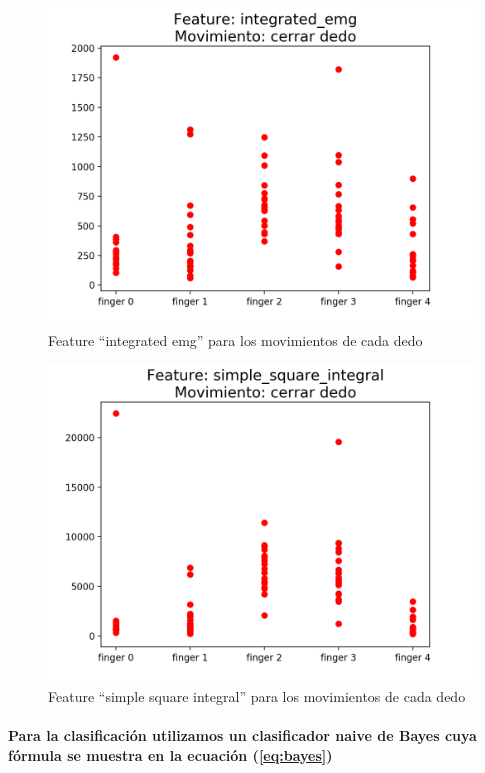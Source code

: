\documentclass{article}
\begin{document}
\begin{figure}[ht]
    \centering
    \includegraphics[width=\textwidth]{Figure_2.png}%
    \caption{Feature “integrated emg” para los movimientos de cada dedo}
    \label{fig:feature2}
\end{figure}

\begin{figure}[ht]
    \centering
    \includegraphics[width=\textwidth]{Figure_3.png}%
    \caption{Feature “simple square integral” para los movimientos de cada dedo}
    \label{fig:feature3}
\end{figure}

\paragraph{
Para la clasificación utilizamos un clasificador naive de Bayes cuya fórmula se muestra en la ecuación (\ref{eq:bayes})
}
\end{document}
